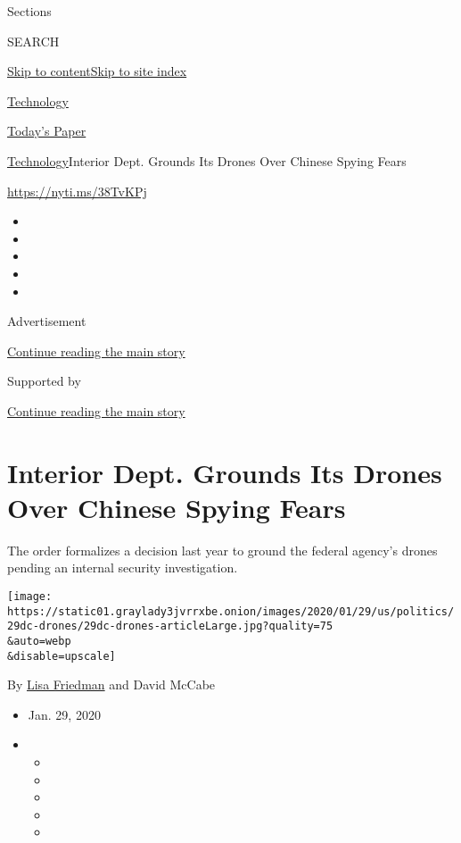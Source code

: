 Sections

SEARCH

\protect\hyperlink{site-content}{Skip to
content}\protect\hyperlink{site-index}{Skip to site index}

\href{https://www.nytimes3xbfgragh.onion/section/technology}{Technology}

\href{https://myaccount.nytimes3xbfgragh.onion/auth/login?response_type=cookie\&client_id=vi}{}

\href{https://www.nytimes3xbfgragh.onion/section/todayspaper}{Today's
Paper}

\href{/section/technology}{Technology}\textbar{}Interior Dept. Grounds
Its Drones Over Chinese Spying Fears

\href{https://nyti.ms/38TvKPj}{https://nyti.ms/38TvKPj}

\begin{itemize}
\item
\item
\item
\item
\item
\end{itemize}

Advertisement

\protect\hyperlink{after-top}{Continue reading the main story}

Supported by

\protect\hyperlink{after-sponsor}{Continue reading the main story}

\hypertarget{interior-dept-grounds-its-drones-over-chinese-spying-fears}{%
\section{Interior Dept. Grounds Its Drones Over Chinese Spying
Fears}\label{interior-dept-grounds-its-drones-over-chinese-spying-fears}}

The order formalizes a decision last year to ground the federal agency's
drones pending an internal security investigation.

\texttt{[image: https://static01.graylady3jvrrxbe.onion/images/2020/01/29/us/politics/29dc-drones/29dc-drones-articleLarge.jpg?quality=75\\\&auto=webp\\\&disable=upscale]}

By \href{https://www.nytimes3xbfgragh.onion/by/lisa-friedman}{Lisa
Friedman} and David McCabe

\begin{itemize}
\item
  Jan. 29, 2020
\item
  \begin{itemize}
  \item
  \item
  \item
  \item
  \item
  \end{itemize}
\end{itemize}

